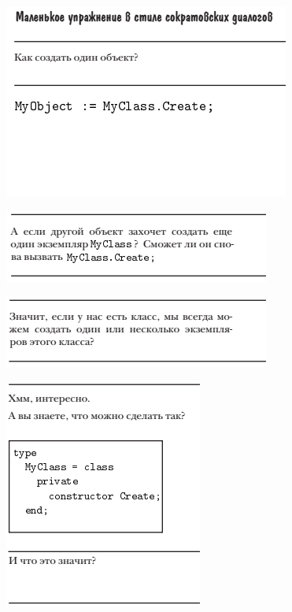 \documentclass{beamer}
\begin{document}
\begin{frame}
\begin{figure}[h]
\centering
\includegraphics[scale=1.0]{images/lec11-pic02.png}
\label{pic-sort}
\end{figure}
\end{frame}

\begin{frame}
\begin{figure}[h]
\centering
\includegraphics[scale=1.0]{images/lec11-pic03.png}
\label{pic-sort}
\end{figure}
\end{frame}

\begin{frame}
\begin{figure}[h]
\centering
\includegraphics[scale=1.0]{images/lec11-pic04.png}
\label{pic-sort}
\end{figure}
\end{frame}

\begin{frame}
\begin{figure}[h]
\centering
\includegraphics[scale=1.0]{images/lec11-pic05.png}
\label{pic-sort}
\end{figure}
\end{frame}
\end{document}
